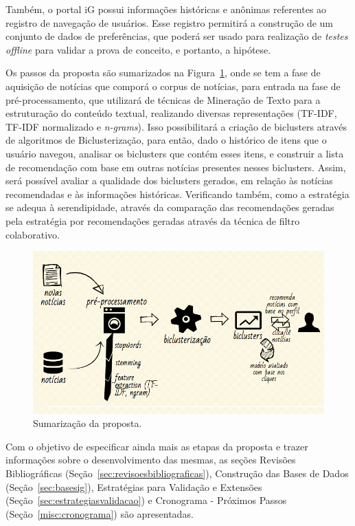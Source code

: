 \documentclass[
    12pt,                %
    oneside,            %
    a4paper,            %
    english,            %
    brazil                %
    ]{abntex2ppgsi}
\begin{document}
Também, o portal iG possui informações históricas e anônimas referentes ao registro de navegação de usuários.
Esse registro permitirá a construção de um conjunto de dados de preferências, que poderá ser usado para realização de \textit{testes offline} para validar a prova de conceito, e portanto, a hipótese.

Os passos da proposta são sumarizados na Figura~\ref{fig:proposta}, onde se tem a fase de aquisição de notícias que comporá o corpus de notícias, para entrada na fase de pré-processamento, que utilizará de técnicas de Mineração de Texto para a estruturação do conteúdo textual, realizando diversas representações (TF-IDF, TF-IDF normalizado e \textit{n-grams}). Isso possibilitará a criação de biclusters através de algoritmos de Biclusterização, para então, dado o histórico de itens que o usuário navegou, analisar os biclusters que contém esses itens, e construir a lista de recomendação com base em outras notícias presentes nesses biclusters. Assim, será possível avaliar a qualidade dos biclusters gerados, em relação às notícias recomendadas e às informações históricas. Verificando também, como a estratégia se adequa à serendipidade, através da comparação das recomendações geradas pela estratégia por recomendações geradas através da técnica de filtro colaborativo.

\begin{figure}[h]
\centering
\includegraphics[width=120mm]{img/proposal.png}
\caption{Sumarização da proposta.}
\label{fig:proposta}
\end{figure}

Com o objetivo de especificar ainda mais as etapas da proposta e trazer informações sobre o desenvolvimento das mesmas, as seções Revisões Bibliográficas (Seção~\ref{sec:revisoesbibliograficas}), Construção das Bases de Dados (Seção~\ref{sec:basesig}), Estratégias para Validação e Extensões (Seção~\ref{sec:estrategiasvalidacao}) e Cronograma - Próximos Passos (Seção~\ref{misc:cronograma}) são apresentadas.
\end{document}
